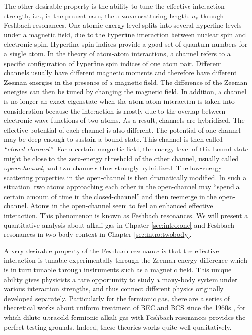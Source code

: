 The other desirable property is the ability to  tune the effective interaction strength, i.e., in the present case, the s-wave scattering length, $a_{s}$ through  Feshbach resonances.  One atomic energy level  splits into several hyperfine levels under a magnetic field,  due to the hyperfine interaction between nuclear spin and electronic spin. Hyperfine spin indices provide a good set of quantum numbers for a single atom.  In the theory of  atom-atom interactions, a channel refers to a specific configuration of hyperfine spin indices of one atom pair. Different channels usually  have different magnetic moments and therefore have different Zeeman energies in the presence of a magnetic field.  The difference of the Zeeman energies can then be tuned by changing the magnetic field.  In addition, a channel is no longer an exact eigenstate when the atom-atom interaction is taken into consideration because the interaction is mostly due to the overlap between electronic wave-functions of two atoms. As a result, channels are hybridized.  The effective potential of each channel is also different.  The potential of one  channel  may be deep enough to sustain a bound state.  This channel is then called \emph{``closed-channel''}.  For a certain magnetic field,  the energy level of this bound state might be close to the zero-energy threshold of the other channel, usually called \emph{open-channel}, and two channels  thus strongly hybridized.  The low-energy scattering properties in the open-channel is then dramatically modified.   In such a situation, two atoms approaching each other in the open-channel may ``spend a certain amount of time in the closed-channel'' and then reemerge in the open-channel.  Atoms in the open-channel seem to feel an enhanced effective interaction.  This phenomenon is known as Feshbach resonances.    We will present a  quantitative analysis about alkali gas in Chpater \ref{sec:intro:one} and  Feshbach resonances in two-body context in Chapter \ref{sec:intro:twobody}. 




A very desirable property of the Feshbach resonance is that the effective interaction is tunable experimentally through the Zeeman energy difference which is in turn  tunable through  instruments such as a magnetic field.  
This unique ability gives physicists a rare opportunity to study  a many-body system under various interaction strengths,  and thus connect different physics originally developed separately.  Particularly for the fermionic gas, there are a series of  theoretical works about uniform treatment of  BEC and BCS since the 1960s \cite{Eagle,LeggettCrossover,Nozieres,RanderiaBEC}, for which dilute ultracold fermionic alkali gas with  Feshbach resonances provides the perfect testing grounds.  Indeed,  these theories works quite well  qualitatively.  

